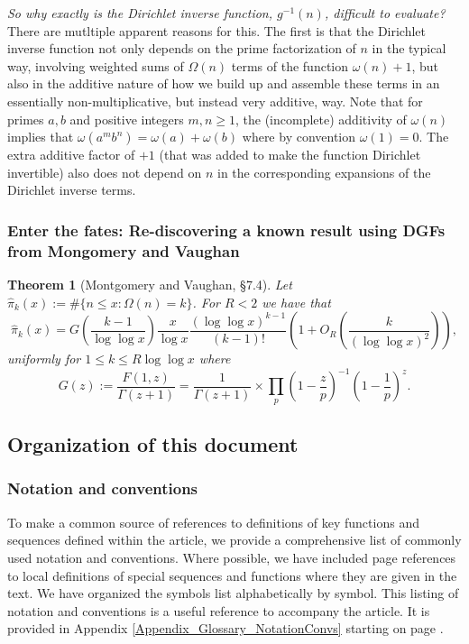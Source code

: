 \documentclass[11pt,reqno,a4letter]{article}
\numberwithin{figure}{section}
\numberwithin{table}{section}
\theoremstyle{plain}
\newtheorem{theorem}{Theorem}
\numberwithin{theorem}{section}
\theoremstyle{definition}
\begin{document}
\textit{So why exactly is the Dirichlet inverse function, $g^{-1}(n)$, difficult to evaluate? } 
There are mutltiple apparent reasons for this. The first is that the Dirichlet inverse function not only 
depends on the prime factorization of $n$ in the typical way, involving weighted sums of $\Omega(n)$ terms of the 
function $\omega(n) + 1$, but also in the additive nature of how we build up and assemble these terms in an essentially 
non-multiplicative, but instead very additive, way.  
Note that for primes $a,b$ and positive integers $m,n \geq 1$, the 
(incomplete) additivity of $\omega(n)$ implies that $\omega(a^m b^n) = \omega(a) + \omega(b)$ where by convention 
$\omega(1) = 0$. The extra additive factor of $+1$ (that was added to make the function Dirichlet invertible) 
also does not depend on $n$ in the corresponding expansions of the Dirichlet inverse terms. 

\subsubsection{Enter the fates: Re-discovering a known result using DGFs from Mongomery and Vaughan} 

\begin{theorem}[Montgomery and Vaughan, \S 7.4]
\label{theorem_HatPi_ExtInTermsOfGz} 
Let $\widehat{\pi}_k(x) := \#\{n \leq x: \Omega(n)=k\}$. For $R < 2$ we have that 
\[
\widehat{\pi}_k(x) = G\left(\frac{k-1}{\log\log x}\right) \frac{x}{\log x} 
     \frac{(\log\log x)^{k-1}}{(k-1)!} \left(1 + O_R\left(\frac{k}{(\log\log x)^2}\right)\right),  
\]
uniformly for $1 \leq k \leq R \log\log x$ where 
\[
G(z) := \frac{F(1, z)}{\Gamma(z+1)} = \frac{1}{\Gamma(z+1)} \times 
     \prod_p \left(1-\frac{z}{p}\right)^{-1} \left(1-\frac{1}{p}\right)^z. 
\]
\end{theorem} 

\subsection{Organization of this document} 

\subsubsection*{Notation and conventions} 
\label{Section_Glossary_NotationConvs} 

To make a common source of references to definitions of key functions and sequences defined within the article, 
we provide a comprehensive list of commonly used notation and conventions. 
Where possible, we have included page references to local definitions of special 
sequences and functions where they are given in the text. We have organized the symbols list alphabetically by symbol. This listing of notation and conventions is a useful reference to accompany the article. 
It is provided in Appendix \ref{Appendix_Glossary_NotationConvs} starting on page 
\pageref{Appendix_Glossary_NotationConvs}. 
\end{document}

